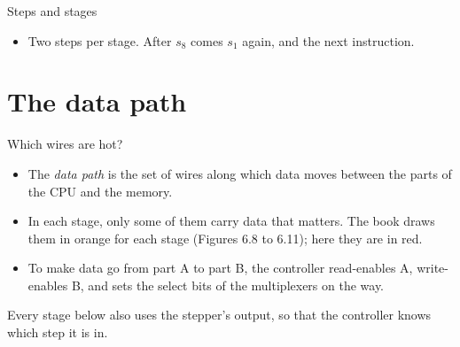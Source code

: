 \documentclass[10pt]{wosm-slides}
\begin{document}
\begin{frame}{Steps and stages}
  \begin{center}
  \end{center}

  \begin{itemize}
    \item Two steps per stage. After $s_8$ comes $s_1$ again, and the next
      instruction.
  \end{itemize}
\end{frame}

\section{The data path}

\begin{frame}{Which wires are hot?}
  \begin{itemize}
    \item The \emph{data path} is the set of wires along which data moves between
      the parts of the CPU and the memory.
    \item In each stage, only some of them carry data that matters. The book draws
      them in orange for each stage (Figures 6.8 to 6.11); here they are in red.
    \item To make data go from part A to part B, the controller \alert{read-enables}
      A, \alert{write-enables} B, and sets the select bits of the multiplexers on the
      way.
  \end{itemize}

  \begin{remark}
    Every stage below also uses the stepper's output, so that the controller knows
    which step it is in.
  \end{remark}
\end{frame}
\end{document}
